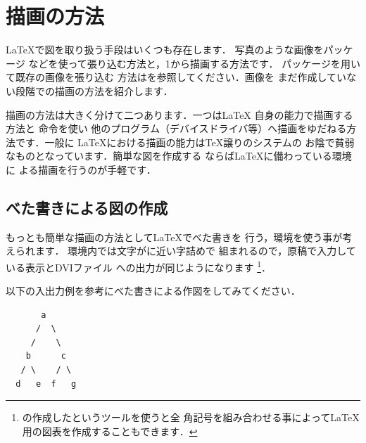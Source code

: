 \section{描画の方法}
{\LaTeX}で図を取り扱う手段はいくつも存在します．
写真のような画像をパッケージ
などを使って張り込む方法と，1から描画する方法です．
パッケージを用いて既存の画像を張り込む
方法はを参照してください．画像を
まだ作成していない段階での描画の方法を紹介します．

描画の方法は大きく分けて二つあります．一つは{\LaTeX}
自身の能力で描画する方法と 命令を使い
他のプログラム（デバイスドライバ等）へ描画をゆだねる方法です．一般に
{\LaTeX}における描画の能力は{\TeX}譲りのシステムの
お陰で貧弱なものとなっています．簡単な図を作成する
ならば{\LaTeX}に備わっている環境に
よる描画を行うのが手軽です．

\subsection{べた書きによる図の作成}
もっとも簡単な描画の方法として{\LaTeX}でべた書きを
行う，環境を使う事が考えられます．
環境内では文字が{}に近い字詰めで
組まれるので，原稿で入力している表示とDVIファイル
への出力が同じようになります%
\footnote{の作成したというツールを使うと全
角記号を組み合わせる事によって{\LaTeX}用の図表を作成することもできます．}．

\begin{Exe}
以下の入出力例を参考にべた書きによる作図をしてみてください．
\begin{InOut}
\begin{verbatim}
       a
      /  \
     /    \
    b      c
   / \    / \
  d   e  f   g
\end{verbatim}
\end{InOut}

\end{Exe}




